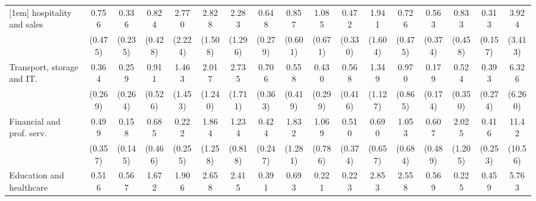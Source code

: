 {\begin{tabular}{l*{16}{c}}
[1em]
hospitality and sales&       0.756         &       0.336         &       0.824         &       2.770         &       2.828         &       2.283         &       0.648         &       0.857         &       1.085         &       0.472         &       1.941         &       0.726         &       0.563         &       0.833         &       0.313\sym{*}  &       3.924         \\
                    &     (0.475)         &     (0.235)         &     (0.428)         &     (2.224)         &     (1.508)         &     (1.296)         &     (0.279)         &     (0.601)         &     (0.671)         &     (0.330)         &     (1.604)         &     (0.475)         &     (0.374)         &     (0.458)         &     (0.157)         &     (3.413)         \\
[1em]
Transport, storage and IT.&       0.364         &       0.259         &       0.911         &       1.463         &       2.017         &       2.735         &       0.706         &       0.558         &       0.430         &       0.568         &       1.349         &       0.970         &       0.179         &       0.524         &       0.393         &       6.326         \\
                    &     (0.269)         &     (0.264)         &     (0.526)         &     (1.453)         &     (1.240)         &     (1.711)         &     (0.363)         &     (0.419)         &     (0.299)         &     (0.416)         &     (1.127)         &     (0.865)         &     (0.174)         &     (0.350)         &     (0.274)         &     (6.260)         \\
[1em]
Financial and prof. serv.&       0.499         &       0.158\sym{*}  &       0.685         &       0.222         &       1.864         &       1.234         &       0.424         &       1.832         &       1.069         &       0.510         &       0.690         &       1.053         &       0.607         &       2.025         &       0.416         &       11.42\sym{**} \\
                    &     (0.357)         &     (0.145)         &     (0.466)         &     (0.255)         &     (1.258)         &     (0.818)         &     (0.247)         &     (1.281)         &     (0.786)         &     (0.374)         &     (0.657)         &     (0.684)         &     (0.489)         &     (1.205)         &     (0.253)         &     (10.56)         \\
[1em]
Education and healthcare&       0.516         &       0.567         &       1.672         &       1.906         &       2.658         &       2.415         &       0.391         &       0.693         &       0.221         &       0.223         &       2.853         &       2.558         &       0.569         &       0.225         &       0.459         &       5.763         \\

\end{tabular}}
